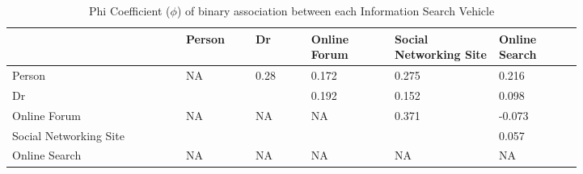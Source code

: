 \begin{table}[ht]

\caption{\label{tab:model-2-phi}Phi Coefficient ($\phi$) of binary association between each Information Search Vehicle}
\centering
\begin{tabular}{p{0.25\linewidth} p{0.10\linewidth} p{0.08\linewidth} p{0.12\linewidth} p{0.15\linewidth} p{0.12\linewidth}}
\hline
 & Person & Dr & Online Forum & Social Networking Site & Online Search\\
\hline
Person& NA& 0.28& 0.172& 0.275& 0.216\\

Dr & & & 0.192 & 0.152 & 0.098\\

Online Forum& NA& NA& NA& 0.371& -0.073\\

Social Networking Site & & & & & 0.057\\

Online Search& NA& NA& NA& NA& NA\\
\hline
\end{tabular}
\end{table}